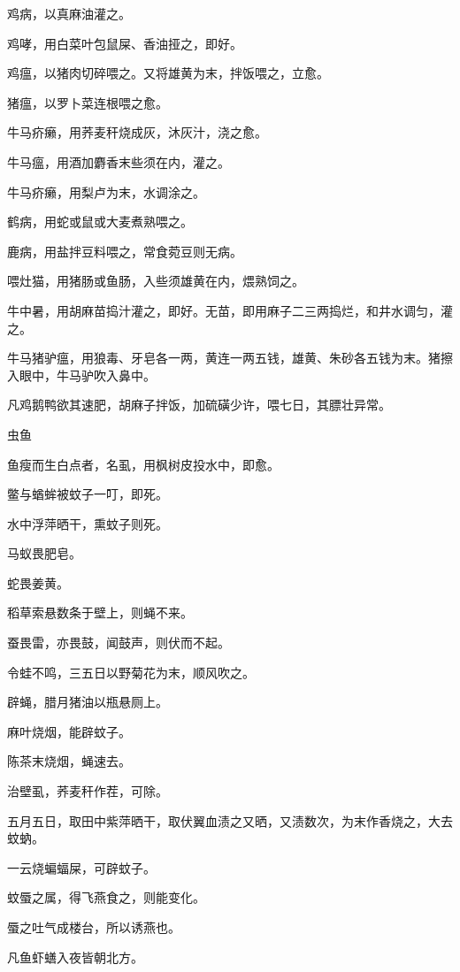 \documentclass[a4paper,12pt,UTF8,twoside]{ctexbook}
\begin{document}
    鸡病，以真麻油灌之。
    
    鸡哮，用白菜叶包鼠屎、香油挜之，即好。
    
    鸡瘟，以猪肉切碎喂之。又将雄黄为末，拌饭喂之，立愈。
    
    猪瘟，以罗卜菜连根喂之愈。
    
    牛马疥癞，用荞麦秆烧成灰，沐灰汁，浇之愈。
    
    牛马瘟，用酒加麝香末些须在内，灌之。
    
    牛马疥癞，用梨卢为末，水调涂之。
    
    鹤病，用蛇或鼠或大麦煮熟喂之。
    
    鹿病，用盐拌豆料喂之，常食菀豆则无病。
    
    喂灶猫，用猪肠或鱼肠，入些须雄黄在内，煨熟饲之。
    
    牛中暑，用胡麻苗捣汁灌之，即好。无苗，即用麻子二三两捣烂，和井水调匀，灌之。
    
    牛马猪驴瘟，用狼毒、牙皂各一两，黄连一两五钱，雄黄、朱砂各五钱为末。猪擦入眼中，牛马驴吹入鼻中。
    
    凡鸡鹅鸭欲其速肥，胡麻子拌饭，加硫磺少许，喂七日，其膘壮异常。
    
    虫鱼
    
    鱼瘦而生白点者，名虱，用枫树皮投水中，即愈。
    
    鳖与蝤蛑被蚊子一叮，即死。
    
    水中浮萍晒干，熏蚊子则死。
    
    马蚁畏肥皂。
    
    蛇畏姜黄。
    
    稻草索悬数条于壁上，则蝇不来。
    
    蚕畏雷，亦畏鼓，闻鼓声，则伏而不起。
    
    令蛙不鸣，三五日以野菊花为末，顺风吹之。
    
    辟蝇，腊月猪油以瓶悬厕上。
    
    麻叶烧烟，能辟蚊子。
    
    陈茶末烧烟，蝇速去。
    
    治壁虱，荞麦秆作茬，可除。
    
    五月五日，取田中紫萍晒干，取伏翼血渍之又晒，又渍数次，为末作香烧之，大去蚊蚋。
    
    一云烧蝙蝠屎，可辟蚊子。
    
    蚊蜃之属，得飞燕食之，则能变化。
    
    蜃之吐气成楼台，所以诱燕也。
    
    凡鱼虾蟮入夜皆朝北方。
    
\end{document}

